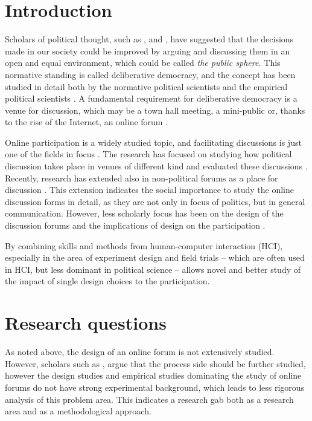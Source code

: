 \documentclass{article}
\begin{document}
\newpage

\section{Introduction}
Scholars of political thought, such as ,  and , have suggested that the decisions made in our society could be improved by arguing and discussing them in an open and equal environment, which could be called \textit{the public sphere.} This normative standing is called deliberative democracy, and the concept has been studied in detail both by the normative political scientists and the empirical political scientists . A fundamental requirement for deliberative democracy is a venue for discussion, which may be a town hall meeting, a mini-public or, thanks to the rise of the Internet, an online forum .

Online participation is a widely studied topic, and facilitating discussions is just one of the fields in focus . The research has focused on studying how political discussion takes place in venues of different kind  and evaluated these discussions . Recently, research has extended also in non-political forums as a place for discussion \cite{graham12}. This extension indicates the social importance to study the online discussion forms in detail, as they are not only in focus of politics, but in general communication. However, less scholarly focus has been on the design of the discussion forums and the implications of design on the participation .

By combining skills and methods from human-computer interaction (HCI), especially in the area of experiment design and field trials  -- which are often used in HCI, but less dominant in political science  -- allows novel and better study of the impact of single design choices to the participation.

\section{Research questions}

As noted above, the design of an online forum is not extensively studied. However, scholars such as , argue that the process side should be further studied, however the design studies and empirical studies dominating the study of online forums do not have strong experimental background, which leads to less rigorous analysis of this problem area. This indicates a research gab both as a research area and as a methodological approach.
\end{document}
